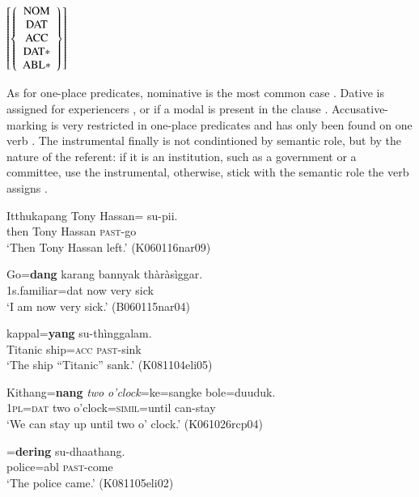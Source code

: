 \documentclass[a4paper,10pt]{article}
\begin{document}
\ea \label{ex:oneplaceschema}
$
\left[
\left\{
\begin{array}{c}
   \rm NOM\\ 
   \rm DAT\\
   \rm ACC\\ 
   \rm DAT*\\ 
   \rm ABL* 
\end{array}
\right\}
\right]
$
\z


As for one-place predicates, nominative is the most common case . 
Dative is assigned for experiencers , or if a modal is present in the clause . 
Accusative-marking is very restricted in one-place predicates and has only been found on one verb   .
The instrumental finally is not condintioned by semantic role, but by the nature of the referent: if it is an institution, such as a government or a committee, use the instrumental, otherwise, stick with the semantic role the verb assigns  .

\ea\label{ex:val:1:nom}
\gll Itthukapang      Tony Hassan=\zero{} su-pii. \\ %
      then Tony Hassan \textsc{past}-go \\
    `Then Tony Hassan left.' (K060116nar09)
\z
 
\ea\label{ex:val:1:dat}
\gll Go=\textbf{dang}    karang bannyak thàràsìggar. \\
     1s.familiar=dat now very sick  \\
    `I am now very sick.' (B060115nar04)
\z

\ea\label{ex:val:1:acc}
 kappal=\textbf{yang} su-thìnggalam. \\
     Titanic ship=\textsc{acc} \textsc{past}-sink  \\
    `The ship ``Titanic'' sank.' (K081104eli05)
\z

\ea\label{ex:val:1:mod}
\gll   Kithang=\textbf{nang}   \el{}    {\em two} {\em o'clock}=ke=sangke  bole=duuduk. \\
      \textsc{1pl}=\textsc{dat} { }    two o'clock=\textsc{simil}=until can-stay  \\
    `We can stay up until two o' clock.' (K061026rcp04)
\z

\ea\label{ex:val:1:instr}
=\textbf{dering} su-dhaathang. \\
     police=abl \textsc{past}-come  \\
    `The police came.' (K081105eli02)
\z
\end{document}
